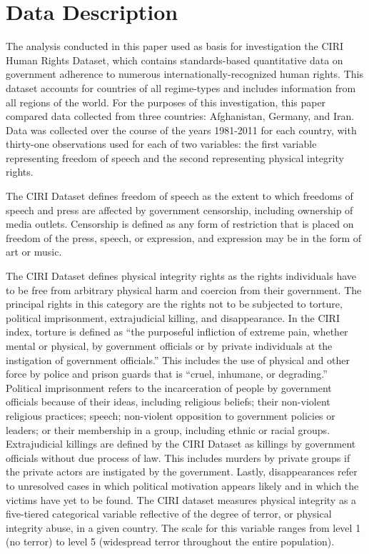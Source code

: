 \documentclass{article}
\begin{document}
\section{Data Description}
The analysis conducted in this paper used as basis for investigation the CIRI Human Rights Dataset, which contains standards-based quantitative data on government adherence to numerous internationally-recognized human rights. This dataset accounts for countries of all regime-types and includes information from all regions of the world. For the purposes of this investigation, this paper compared data collected from three countries: Afghanistan, Germany, and Iran. Data was collected over the course of the years 1981-2011 for each country, with thirty-one observations used for each of two variables: the first variable representing freedom of speech and the second representing physical integrity rights. 

The CIRI Dataset defines freedom of speech as the extent to which freedoms of speech and press are affected by government censorship, including ownership of media outlets. Censorship is defined as any form of restriction that is placed on freedom of the press, speech, or expression, and expression may be in the form of art or music. 

The CIRI Dataset defines physical integrity rights as the rights individuals have to be free from arbitrary physical harm and coercion from their government. The principal rights in this category are the rights not to be subjected to torture, political imprisonment, extrajudicial killing, and disappearance. In the CIRI index, torture is defined as “the purposeful infliction of extreme pain, whether mental or physical, by government officials or by private individuals at the instigation of government officials.” This includes the use of physical and other force by police and prison guards that is “cruel, inhumane, or degrading.” Political imprisonment refers to the incarceration of people by government officials because of their ideas, including religious beliefs; their non-violent religious practices; speech; non-violent opposition to government policies or leaders; or their membership in a group, including ethnic or racial groups. Extrajudicial killings are defined by the CIRI Dataset as killings by government officials without due process of law. This includes murders by private groups if the private actors are instigated by the government. Lastly, disappearances refer to unresolved cases in which political motivation appears likely and in which the victims have yet to be found. The CIRI dataset measures physical integrity as a five-tiered categorical variable reflective of the degree of terror, or physical integrity abuse, in a given country. The scale for this variable ranges from level 1 (no terror) to level 5 (widespread terror throughout the entire population). 
\end{document}
